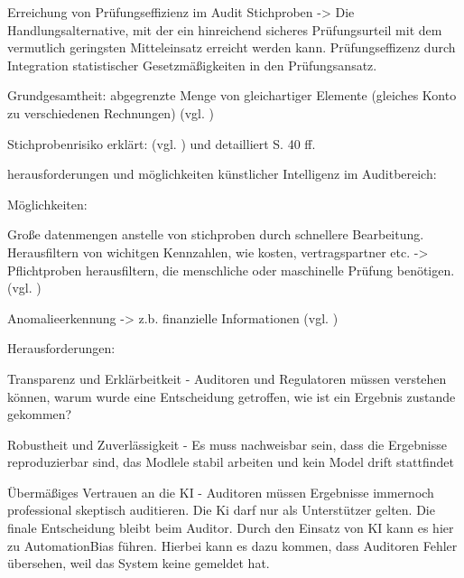 

Erreichung von Prüfungseffizienz im Audit Stichproben -> Die Handlungsalternative, mit der ein hinreichend sicheres Prüfungsurteil mit dem vermutlich geringsten Mitteleinsatz erreicht werden kann.
Prüfungseffizenz durch Integration statistischer Gesetzmäßigkeiten in den Prüfungsansatz.

Grundgesamtheit: abgegrenzte Menge von gleichartiger Elemente (gleiches Konto zu verschiedenen Rechnungen)
(vgl. \cite[S.11]{baumeister2019sample})

Stichprobenrisiko erklärt: (vgl. \cite[S.12]{baumeister2019sample}) und detailliert S. 40 ff.


herausforderungen und möglichkeiten künstlicher Intelligenz im Auditbereich:

Möglichkeiten:

Große datenmengen anstelle von stichproben durch schnellere Bearbeitung.
Herausfiltern von wichitgen Kennzahlen, wie kosten, vertragspartner etc.
-> Pflichtproben herausfiltern, die menschliche oder maschinelle Prüfung benötigen.
(vgl. \autocite[S.3]{KOKINA2025100734})

Anomalieerkennung -> z.b. finanzielle Informationen (vgl. \autocite[S.2]{KOKINA2025100734})

Herausforderungen:

Transparenz und Erklärbeitkeit - Auditoren und Regulatoren müssen verstehen können, warum wurde eine Entscheidung getroffen, wie ist ein Ergebnis zustande gekommen? \autocite[S.16]{KOKINA2025100734}

Robustheit und Zuverlässigkeit - Es muss nachweisbar sein, dass die Ergebnisse reproduzierbar sind, das Modlele stabil arbeiten und kein Model drift stattfindet 
\autocite[S. 13 f.]{KOKINA2025100734}

Übermäßiges Vertrauen an die KI - Auditoren müssen Ergebnisse immernoch professional skeptisch auditieren. Die Ki darf nur als Unterstützer gelten. Die finale Entscheidung bleibt beim Auditor. Durch den Einsatz von KI kann es hier zu AutomationBias führen. Hierbei kann es dazu kommen, dass Auditoren Fehler übersehen, weil das System keine gemeldet hat. \autocite[S.425 f.]{lyell2017automation}